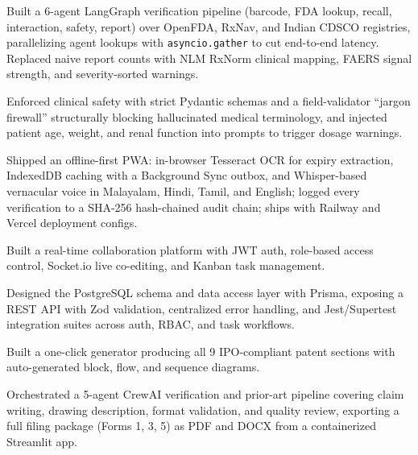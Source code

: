 \documentclass[a4paper,10pt]{article}
\begin{document}
\begin{points}
  \item Built a 6-agent LangGraph verification pipeline (barcode, FDA lookup, recall, interaction, safety, report) over OpenFDA, RxNav, and Indian CDSCO registries, parallelizing agent lookups with \texttt{asyncio.gather} to cut end-to-end latency. Replaced naive report counts with NLM RxNorm clinical mapping, FAERS signal strength, and severity-sorted warnings.
  \item Enforced clinical safety with strict Pydantic schemas and a field-validator ``jargon firewall'' structurally blocking hallucinated medical terminology, and injected patient age, weight, and renal function into prompts to trigger dosage warnings.
  \item Shipped an offline-first PWA: in-browser Tesseract OCR for expiry extraction, IndexedDB caching with a Background Sync outbox, and Whisper-based vernacular voice in Malayalam, Hindi, Tamil, and English; logged every verification to a SHA-256 hash-chained audit chain; ships with Railway and Vercel deployment configs.
\end{points}
\gap

\begin{points}
  \item Built a real-time collaboration platform with JWT auth, role-based access control, Socket.io live co-editing, and Kanban task management.
  \item Designed the PostgreSQL schema and data access layer with Prisma, exposing a REST API with Zod validation, centralized error handling, and Jest/Supertest integration suites across auth, RBAC, and task workflows.
\end{points}
\gap

\begin{points}
  \item Built a one-click generator producing all 9 IPO-compliant patent sections with auto-generated block, flow, and sequence diagrams.
  \item Orchestrated a 5-agent CrewAI verification and prior-art pipeline covering claim writing, drawing description, format validation, and quality review, exporting a full filing package (Forms 1, 3, 5) as PDF and DOCX from a containerized Streamlit app.
\end{points}
\gap
\end{document}
